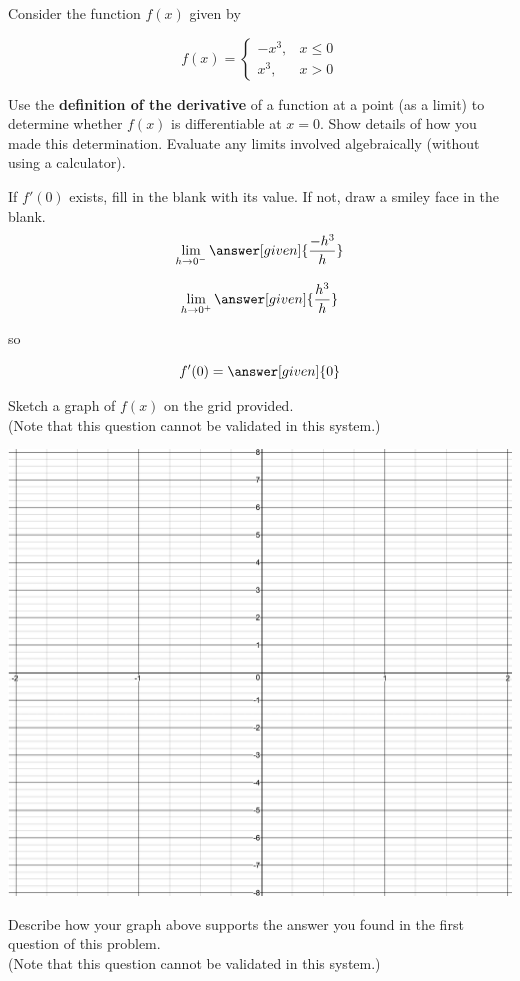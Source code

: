 \documentclass[handout]{ximera}
\begin{document}
\begin{problem}
Consider the function $f(x)$ given by

$$f(x) = \begin{cases} \displaystyle -x^3, & x \leq 0 \\ x^3, & x >0 \end{cases}$$

\begin{question}
Use the \textbf{definition of the derivative} of a function at a point (as a limit) to determine whether $f(x)$ is differentiable at $x=0$. Show details of how you made this determination. Evaluate any limits involved algebraically (without using a calculator).

If $f'(0)$ exists, fill in the blank with its value. If not, draw a smiley face in the blank. 
\[
\displaystyle \lim_{h\to 0^-} \answer[given]{\dfrac{-h^3}{h}}
\]

\[
\displaystyle \lim_{h\to 0^+} \answer[given]{\dfrac{h^3}{h}}
\]

so

\[
f'(0) = \answer[given]{0}
\]
\end{question}

\begin{question}
Sketch a graph of $f(x)$ on the grid provided. \\(Note that this question cannot be validated in this system.)

\includegraphics[scale=0.4]{2X8.png}
\end{question}

\begin{question}
Describe how your graph above supports the answer you found in the first question of this problem. \\(Note that this question cannot be validated in this system.)
\begin{freeResponse}
\end{freeResponse}
\end{question}
\end{problem}
\end{document}
